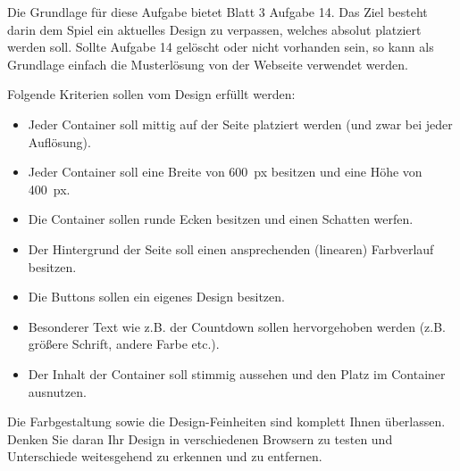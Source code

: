 %
\par Die Grundlage für diese Aufgabe bietet Blatt 3 Aufgabe 14. Das Ziel
besteht darin dem Spiel ein aktuelles Design zu verpassen, welches absolut
platziert werden soll. Sollte Aufgabe 14 gelöscht oder nicht vorhanden sein,
so kann als Grundlage einfach die Musterlösung von der Webseite verwendet
werden.
%
\par Folgende Kriterien sollen vom Design erfüllt werden:
%
\begin{itemize}
\item
Jeder Container soll mittig auf der Seite platziert werden (und zwar bei jeder
Auflösung).
\item
Jeder Container soll eine Breite von \qty{600}{px} besitzen und eine Höhe von
\qty{400}{px}.
\item
Die Container sollen runde Ecken besitzen und einen Schatten werfen.
\item
Der Hintergrund der Seite soll einen ansprechenden (linearen) Farbverlauf
besitzen.
\item
Die Buttons sollen ein eigenes Design besitzen.
\item
Besonderer Text wie z.B. der Countdown sollen hervorgehoben werden (z.B.
größere Schrift, andere Farbe etc.).
\item
Der Inhalt der Container soll stimmig aussehen und den Platz im Container
ausnutzen.
\end{itemize}
%
\par Die Farbgestaltung sowie die Design-Feinheiten sind komplett Ihnen
überlassen. Denken Sie daran Ihr Design in verschiedenen Browsern zu testen
und Unterschiede weitesgehend zu erkennen und zu entfernen.
